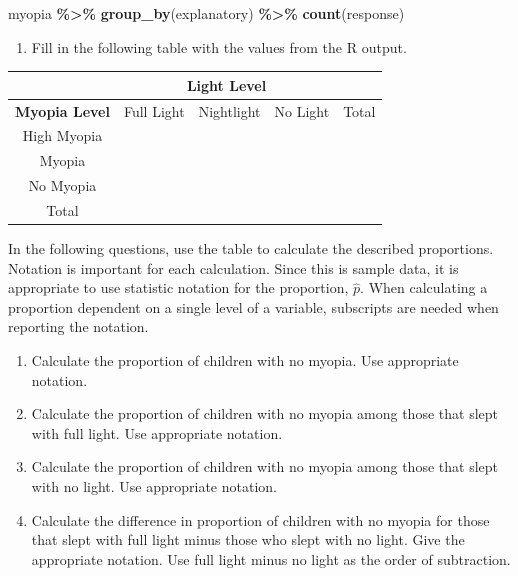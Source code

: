 \documentclass[
]{report}
\newenvironment{Shaded}{\begin{snugshade}}{\end{snugshade}}
\newcommand{\FunctionTok}[1]{\textcolor[rgb]{0.13,0.29,0.53}{\textbf{#1}}}
\newcommand{\NormalTok}[1]{#1}
\newcommand{\SpecialCharTok}[1]{\textcolor[rgb]{0.81,0.36,0.00}{\textbf{#1}}}
\providecommand{\tightlist}{%
  \setlength{\itemsep}{0pt}\setlength{\parskip}{0pt}}
\begin{document}
\begin{Shaded}
\begin{Highlighting}[]
\NormalTok{myopia }\SpecialCharTok{\%\textgreater{}\%} \FunctionTok{group\_by}\NormalTok{(explanatory) }\SpecialCharTok{\%\textgreater{}\%} \FunctionTok{count}\NormalTok{(response)}
\end{Highlighting}
\end{Shaded}

\begin{enumerate}
\def\labelenumi{\arabic{enumi}.}
\setcounter{enumi}{1}
\tightlist
\item
  Fill in the following table with the values from the R output.
\end{enumerate}

\begin{center}
\begingroup
\setlength{\tabcolsep}{14pt} %
\renewcommand{\arraystretch}{2} %
\begin{tabular}{|c|c|c|c|c|}
\hline
 & \multicolumn{3}{|c|}{\textbf{Light Level}} & \\ \hline
\textbf{Myopia Level} & Full Light & Nightlight & No Light & Total \\ \hline
 High Myopia & & & & \\ \hline
 Myopia & & & & \\ \hline
 No Myopia & & & & \\ \hline
 Total & & & & \\ \hline  
\end{tabular}
\endgroup
\end{center}

In the following questions, use the table to calculate the described proportions. Notation is important for each calculation. Since this is sample data, it is appropriate to use statistic notation for the proportion, \(\hat{p}\). When calculating a proportion dependent on a single level of a variable, subscripts are needed when reporting the notation.

\begin{enumerate}
\def\labelenumi{\arabic{enumi}.}
\setcounter{enumi}{2}
\item
  Calculate the proportion of children with no myopia. Use appropriate notation.
  \vspace{0.3in}
\item
  Calculate the proportion of children with no myopia among those that slept with full light. Use appropriate notation.
  \vspace{0.3in}
\item
  Calculate the proportion of children with no myopia among those that slept with no light. Use appropriate notation.
  \vspace{0.3in}
\item
  Calculate the difference in proportion of children with no myopia for those that slept with full light minus those who slept with no light. Give the appropriate notation. Use full light minus no light as the order of subtraction.
  \vspace{0.8in}
\end{enumerate}
\end{document}
